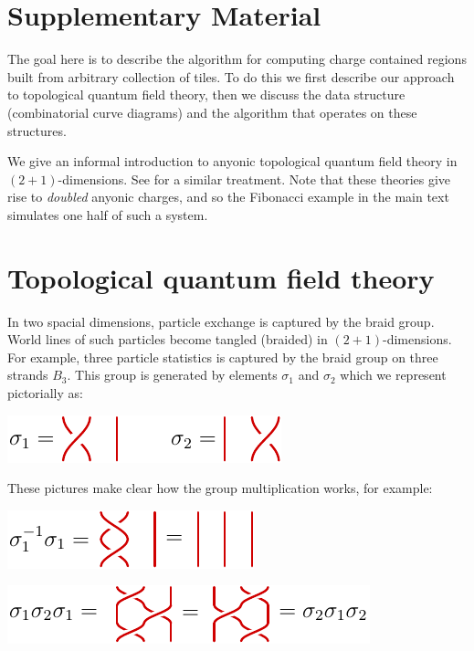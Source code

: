 \documentclass[aps, prl, letterpaper, twocolumn, superscriptaddress, notitlepage, 10pt]{revtex4-1}
\begin{document}
\appendix

\section*{Supplementary Material}

The goal here is to describe the algorithm for
computing charge contained regions built from 
arbitrary collection of tiles.
To do this we first describe our approach
to topological quantum field theory,
then we discuss the data structure 
(combinatorial curve diagrams) and the algorithm
that operates on these structures.

We give an informal introduction to
anyonic topological quantum
field theory in $(2+1)$-dimensions.
See \cite{beverland2014} for a similar treatment.
Note that these theories give rise to
\emph{doubled} anyonic charges, and so
the Fibonacci example in the main text simulates
one half of such a system.

\section{Topological quantum field theory}

In two spacial dimensions, particle exchange is
captured by the braid group.
World lines of such particles 
become tangled (braided) in $(2+1)$-dimensions.
For example, three particle statistics is captured
by the braid group on three strands $B_3.$
This group is generated by elements $\sigma_1$
and $\sigma_2$ which we represent pictorially as:
\begin{center}
\includegraphics[]{pic-braid-group.pdf}
\end{center}

These pictures make clear how the group
multiplication works, for example:
\begin{center}
\includegraphics[]{pic-braid-group-1.pdf}
\end{center}
\begin{center}
\includegraphics[]{pic-braid-relation.pdf}
\end{center}
\end{document}
